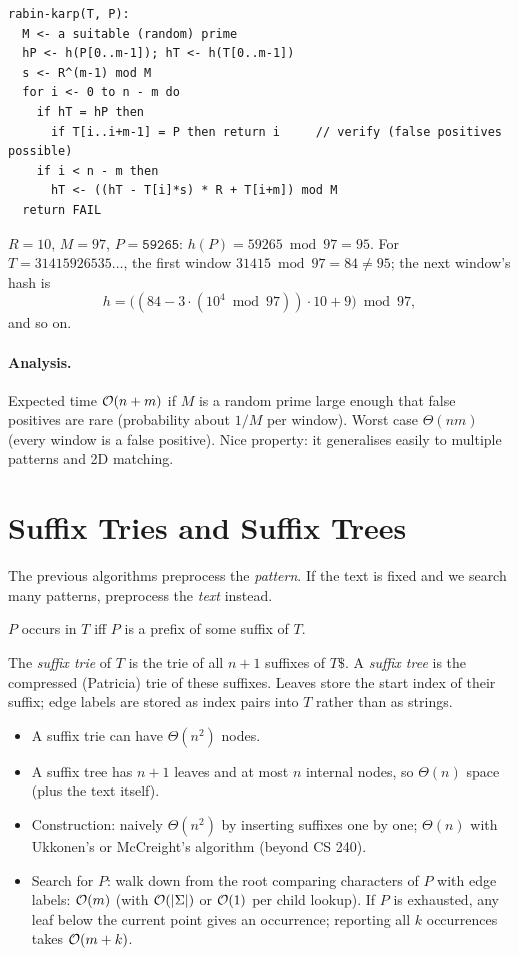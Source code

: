 \begin{lstlisting}
rabin-karp(T, P):
  M <- a suitable (random) prime
  hP <- h(P[0..m-1]); hT <- h(T[0..m-1])
  s <- R^(m-1) mod M
  for i <- 0 to n - m do
    if hT = hP then
      if T[i..i+m-1] = P then return i     // verify (false positives possible)
    if i < n - m then
      hT <- ((hT - T[i]*s) * R + T[i+m]) mod M
  return FAIL
\end{lstlisting}

\begin{example}
$R = 10$, $M = 97$, $P = \texttt{59265}$: $h(P) = 59265 \bmod 97 = 95$.
For $T = 31415926535\ldots$, the first window $31415 \bmod 97 = 84 \ne 95$; the
next window's hash is
\[h = \big((84 - 3 \cdot (10^4 \bmod 97))\cdot 10 + 9\big) \bmod 97,\]
and so on.
\end{example}

\paragraph{Analysis.} Expected time $\mathcal{O}(n + m)$ if $M$ is a random prime
large enough that false positives are rare (probability about $1/M$ per window).
Worst case $\Theta(nm)$ (every window is a false positive). Nice property: it
generalises easily to multiple patterns and 2D matching.

\section{Suffix Tries and Suffix Trees}

The previous algorithms preprocess the \emph{pattern}. If the text is fixed and
we search many patterns, preprocess the \emph{text} instead.

\begin{lemma}
$P$ occurs in $T$ iff $P$ is a prefix of some suffix of $T$.
\end{lemma}

\begin{definition}
The \emph{suffix trie} of $T$ is the trie of all $n+1$ suffixes of $T\$$. A
\emph{suffix tree} is the compressed (Patricia) trie of these suffixes. Leaves
store the start index of their suffix; edge labels are stored as index pairs
into $T$ rather than as strings.
\end{definition}

\begin{itemize}
  \item A suffix trie can have $\Theta(n^2)$ nodes.
  \item A suffix tree has $n+1$ leaves and at most $n$ internal nodes, so
        $\Theta(n)$ space (plus the text itself).
  \item Construction: naively $\Theta(n^2)$ by inserting suffixes one by one;
        $\Theta(n)$ with Ukkonen's or McCreight's algorithm (beyond CS 240).
  \item Search for $P$: walk down from the root comparing characters of $P$ with
        edge labels: $\mathcal{O}(m)$ (with $\mathcal{O}(|\Sigma|)$ or $\mathcal{O}(1)$ per child
        lookup). If $P$ is exhausted, any leaf below the current point gives an
        occurrence; reporting all $k$ occurrences takes $\mathcal{O}(m + k)$.
\end{itemize}

